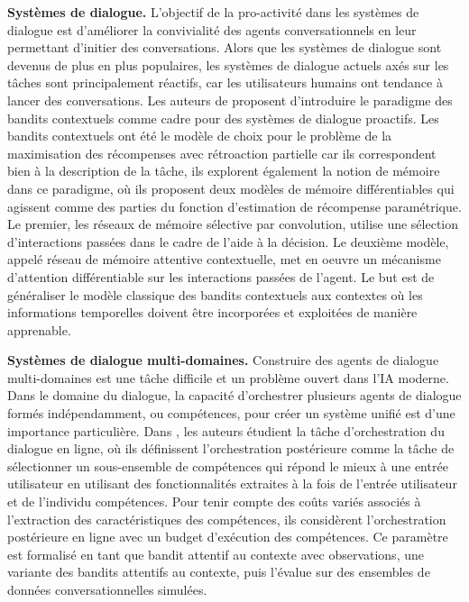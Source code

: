 \documentclass[conference]{IEEEtran}
\newcommand{\1}[1]{\mathbbm{1}_{\left\{#1\right\}}}
\begin{document}
\textbf{Systèmes de dialogue.} L'objectif de la pro-activité dans les systèmes de dialogue est d'améliorer la convivialité des agents conversationnels en leur permettant d'initier des conversations. Alors que les systèmes de dialogue sont devenus de plus en plus populaires, les systèmes de dialogue actuels axés sur les tâches sont principalement réactifs, car les utilisateurs humains ont tendance à lancer des conversations. Les auteurs de \cite{silander2018contextual} proposent d'introduire le paradigme des bandits contextuels comme cadre pour des systèmes de dialogue proactifs. Les bandits contextuels ont été le modèle de choix pour le problème de la maximisation des récompenses avec rétroaction partielle car ils correspondent bien à la description de la tâche, ils explorent également la notion de mémoire dans ce paradigme, où ils proposent deux modèles de mémoire différentiables qui agissent comme des parties du fonction d'estimation de récompense paramétrique. Le premier, les réseaux de mémoire sélective par convolution, utilise une sélection d'interactions passées dans le cadre de l'aide à la décision. Le deuxième modèle, appelé réseau de mémoire attentive contextuelle, met en oeuvre un mécanisme d'attention différentiable sur les interactions passées de l'agent. Le but est de généraliser le modèle classique des bandits contextuels aux contextes où les informations temporelles doivent être incorporées et exploitées de manière apprenable.
 
\textbf{Systèmes de dialogue multi-domaines.} Construire des agents de dialogue multi-domaines est une tâche difficile et un problème ouvert dans l'IA moderne. Dans le domaine du dialogue, la capacité d'orchestrer plusieurs agents de dialogue formés indépendamment, ou compétences, pour créer un système unifié est d'une importance particulière. Dans \cite{upadhyaybandit}, les auteurs étudient la tâche d'orchestration du dialogue en ligne, où ils définissent l'orchestration postérieure comme la tâche de sélectionner un sous-ensemble de compétences qui répond le mieux à une entrée utilisateur en utilisant des fonctionnalités extraites à la fois de l'entrée utilisateur et de l'individu compétences. Pour tenir compte des coûts variés associés à l'extraction des caractéristiques des compétences, ils considèrent l'orchestration postérieure en ligne avec un budget d'exécution des compétences. Ce paramètre est formalisé en tant que bandit attentif au contexte avec observations, une variante des bandits attentifs au contexte, puis l'évalue sur des ensembles de données conversationnelles simulées.
\end{document}
